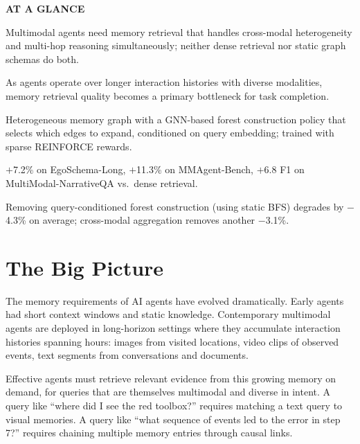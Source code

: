 \documentclass[10pt,twocolumn]{article}
\begin{document}
\begin{mdframed}[backgroundcolor=boxgray,linecolor=rulered,linewidth=1pt,
    innerleftmargin=6pt,innerrightmargin=6pt,
    innertopmargin=6pt,innerbottommargin=6pt]
\textbf{\small AT A GLANCE}\par\vspace{4pt}
\begin{description}[leftmargin=0pt,labelsep=4pt,itemsep=2pt,parsep=0pt,
    font=\small\bfseries]
  \item[Problem:] Multimodal agents need memory retrieval that handles
    cross-modal heterogeneity and multi-hop reasoning simultaneously;
    neither dense retrieval nor static graph schemas do both.
  \item[Why it matters:] As agents operate over longer interaction
    histories with diverse modalities, memory retrieval quality becomes
    a primary bottleneck for task completion.
  \item[Method:] Heterogeneous memory graph with a GNN-based forest
    construction policy that selects which edges to expand, conditioned
    on query embedding; trained with sparse REINFORCE rewards.
  \item[Result:] $+$7.2\% on EgoSchema-Long, $+$11.3\% on MMAgent-Bench,
    $+$6.8 F1 on MultiModal-NarrativeQA vs.\ dense retrieval.
  \item[Evidence:] Removing query-conditioned forest construction (using
    static BFS) degrades by $-$4.3\% on average; cross-modal aggregation
    removes another $-$3.1\%.
\end{description}
\end{mdframed}

\section{The Big Picture}

The memory requirements of AI agents have evolved dramatically.
Early agents had short context windows and static knowledge.
Contemporary multimodal agents are deployed in long-horizon settings
where they accumulate interaction histories spanning hours: images
from visited locations, video clips of observed events, text segments
from conversations and documents.

Effective agents must retrieve relevant evidence from this growing
memory on demand, for queries that are themselves multimodal and
diverse in intent. A query like ``where did I see the red toolbox?''
requires matching a text query to visual memories. A query like
``what sequence of events led to the error in step 7?'' requires
chaining multiple memory entries through causal links.
\end{document}
